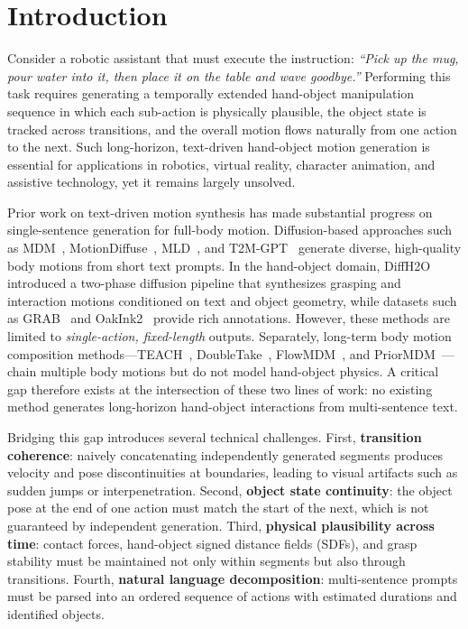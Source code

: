 \documentclass[runningheads]{llncs}
\begin{document}
\section{Introduction}
\label{sec:intro}

Consider a robotic assistant that must execute the instruction: \emph{``Pick up the mug, pour water into it, then place it on the table and wave goodbye.''}
Performing this task requires generating a temporally extended hand-object manipulation sequence in which each sub-action is physically plausible, the object state is tracked across transitions, and the overall motion flows naturally from one action to the next.
Such long-horizon, text-driven hand-object motion generation is essential for applications in robotics, virtual reality, character animation, and assistive technology, yet it remains largely unsolved.

Prior work on text-driven motion synthesis has made substantial progress on single-sentence generation for full-body motion.
Diffusion-based approaches such as MDM~\cite{tevet2023human}, MotionDiffuse~\cite{zhang2022motiondiffuse}, MLD~\cite{chen2023executing}, and T2M-GPT~\cite{zhang2023t2mgpt} generate diverse, high-quality body motions from short text prompts.
In the hand-object domain, DiffH2O~\cite{christen2024diffh2o} introduced a two-phase diffusion pipeline that synthesizes grasping and interaction motions conditioned on text and object geometry, while datasets such as GRAB~\cite{taheri2020grab} and OakInk2~\cite{zhan2024oakink2} provide rich annotations.
However, these methods are limited to \emph{single-action, fixed-length} outputs.
Separately, long-term body motion composition methods---TEACH~\cite{athanasiou2022teach}, DoubleTake~\cite{shafir2024doubletake}, FlowMDM~\cite{barquero2024seamless}, and PriorMDM~\cite{shafir2024priormdm}---chain multiple body motions but do not model hand-object physics.
A critical gap therefore exists at the intersection of these two lines of work: no existing method generates long-horizon hand-object interactions from multi-sentence text.

Bridging this gap introduces several technical challenges.
First, \textbf{transition coherence}: naively concatenating independently generated segments produces velocity and pose discontinuities at boundaries, leading to visual artifacts such as sudden jumps or interpenetration.
Second, \textbf{object state continuity}: the object pose at the end of one action must match the start of the next, which is not guaranteed by independent generation.
Third, \textbf{physical plausibility across time}: contact forces, hand-object signed distance fields (SDFs), and grasp stability must be maintained not only within segments but also through transitions.
Fourth, \textbf{natural language decomposition}: multi-sentence prompts must be parsed into an ordered sequence of actions with estimated durations and identified objects.
\end{document}

